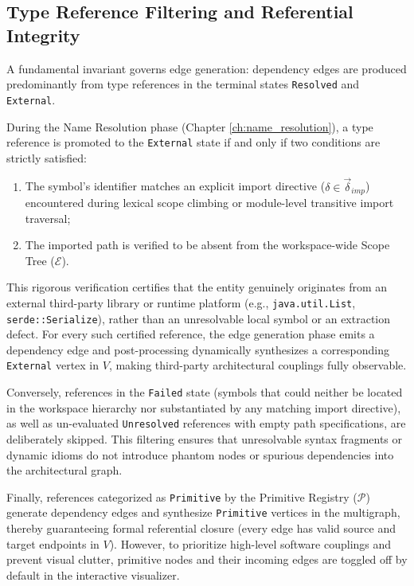 \subsection{Type Reference Filtering and Referential Integrity}

A fundamental invariant governs edge generation: dependency edges are
produced predominantly from type references in the terminal states
\texttt{Resolved}
and \texttt{External}.

During the Name Resolution phase (Chapter \ref{ch:name_resolution}),
a type reference is promoted to the \texttt{External} state if and
only if two conditions are strictly satisfied:
\begin{enumerate}
  \item The symbol's identifier matches an explicit import directive
    ($\delta \in \vec{\delta}_{imp}$) encountered during lexical
    scope climbing or module-level transitive import traversal;
  \item The imported path is verified to be absent from the
    workspace-wide Scope Tree ($\mathcal{E}$).
\end{enumerate}
This rigorous verification certifies that the entity genuinely
originates from an external third-party library or runtime platform
(e.g., \texttt{java.util.List}, \texttt{serde::Serialize}), rather
than an unresolvable local symbol or an extraction defect. For every
such certified reference, the edge generation phase emits a
dependency edge and post-processing dynamically synthesizes a
corresponding \texttt{External} vertex in $V$, making third-party
architectural couplings fully observable.

Conversely, references in the \texttt{Failed} state (symbols that
  could neither be located in the workspace hierarchy nor substantiated
by any matching import directive), as well as un-evaluated
\texttt{Unresolved} references with empty path specifications, are
deliberately skipped. This filtering ensures that unresolvable syntax
fragments or dynamic idioms do not introduce phantom nodes or
spurious dependencies into the architectural graph.

Finally, references categorized as \texttt{Primitive} by the
Primitive Registry ($\mathcal{P}$) generate dependency edges and
synthesize \texttt{Primitive} vertices in the multigraph, thereby
guaranteeing formal referential closure (every edge has valid source
and target endpoints in $V$). However, to prioritize high-level
software couplings and prevent visual clutter, primitive nodes and
their incoming edges are toggled off by default in the interactive visualizer.

